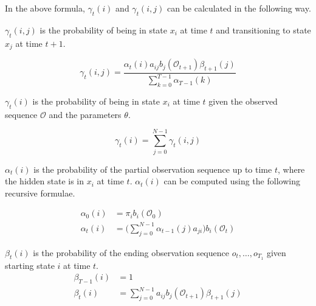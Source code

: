 In the above formula, $\gamma_t(i)$ and $\gamma_t(i, j)$ can be calculated in the following way.

$\gamma_t(i, j)$ is the probability of being in state $x_i$ at time $t$ and transitioning to state $x_j$ at time $t+1$.

\begin{equation*}
\gamma_t(i,j) = \frac { \alpha_t(i) a_{ij} b_j(\mathcal{O}_{t+1}) \beta_{t+1}(j) } { \sum\limits_{k=0}^{T-1} \alpha_{T-1}(k) }
\end{equation*}

$\gamma_t(i)$ is the probability of being in state $x_i$ at time $t$ given the observed sequence $\mathcal{O}$ and the parameters $\theta$.

\begin{equation*}
\gamma_t(i) = \sum\limits_{j=0}^{N-1} \gamma_t(i,j)
\end{equation*}

$\alpha_t(i)$ is the probability of the partial observation sequence up to time $t$, where the hidden state is in $x_i$ at time $t$. $\alpha_t(i)$ can be computed using the following recursive formulae.

\begin{align*}
\alpha_0(i) &= \pi_i b_i(\mathcal{O}_0) \\
\alpha_t(i) &= \Bigg( \sum\limits_{j=0}^{N-1} \alpha_{t-1}(j) a_{ji} \Bigg) b_i(\mathcal{O}_t)
\end{align*}

$\beta_t(i)$ is the probability of the ending observation sequence $o_t,\ldots,o_{T_1}$ given starting state $i$ at time $t$.
\begin{align*}
\beta_{T-1}(i) &= 1 \\
\beta_t(i) &= \sum\limits_{j=0}^{N-1} a_{ij} b_j(\mathcal{O}_{t+1}) \beta_{t+1}(j)
\end{align*}

